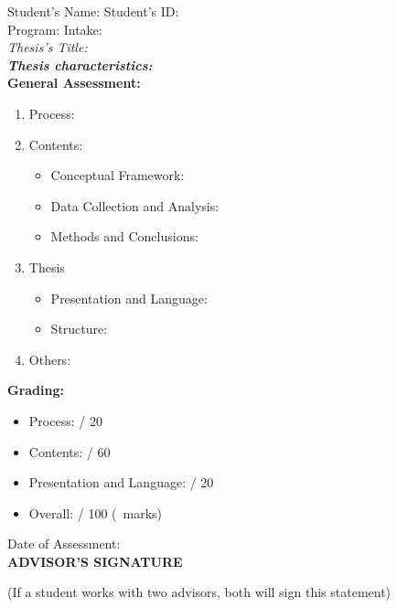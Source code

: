 \noindent Student's Name: \dotfill \hspace{1cm} Student's ID: \dotfill \\
Program: \dotfill \hspace{1cm} Intake: \dotfill \\
\textit{Thesis's Title:} \dotfill \\
\noindent \textbf{\textit{Thesis characteristics:}} \\
\textbf{General Assessment:}
\begin{enumerate}[leftmargin=1cm]
    \item Process: \dotfill
    \item Contents: \dotfill
    \begin{itemize}
        \item Conceptual Framework: \dotfill
        \item Data Collection and Analysis: \dotfill
        \item Methods and Conclusions: \dotfill
    \end{itemize}
    \item Thesis \dotfill
    \begin{itemize}
        \item Presentation and Language: \dotfill
        \item Structure: \dotfill
    \end{itemize}
    \item Others: \dotfill
\end{enumerate}
\textbf{Grading:}
\begin{itemize}
    \item Process: \dotfill / 20
    \item Contents: \dotfill / 60
    \item Presentation and Language: \dotfill / 20
    \item Overall: \dotfill / 100 (\dotfill\ marks)
\end{itemize}
\hspace{0.5\textwidth}Date of Assessment: \dotfill \\

\hspace{0.5\textwidth}\textbf{ADVISOR'S SIGNATURE}

\vspace{3cm}
\noindent\footnotesize{(If a student works with two advisors, both will sign this statement)} 